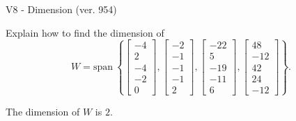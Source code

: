 \begin{exercise}
  \begin{exerciseTitle}V8 - Dimension (ver. 954)\end{exerciseTitle}
  \begin{exerciseStatement}
    Explain how to find the dimension of 
\[W=\mathrm{span}\ \left\{\left[\begin{array}{r}
-4 \\
2 \\
-4 \\
-2 \\
0
\end{array}\right] , \left[\begin{array}{r}
-2 \\
-1 \\
-1 \\
-1 \\
2
\end{array}\right] , \left[\begin{array}{r}
-22 \\
5 \\
-19 \\
-11 \\
6
\end{array}\right] , \left[\begin{array}{r}
48 \\
-12 \\
42 \\
24 \\
-12
\end{array}\right]\right\}.\]



  \end{exerciseStatement}
  \begin{exerciseAnswer}
   The dimension of \(W\) is  \(2\).
  


  \end{exerciseAnswer}
\end{exercise}